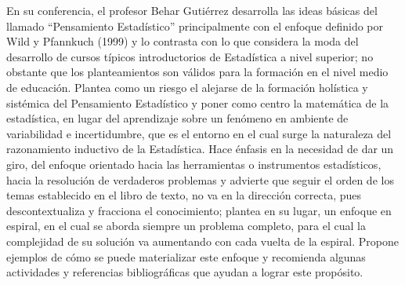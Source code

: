 \noindent En su conferencia, el profesor Behar Gutiérrez desarrolla las ideas básicas del llamado “Pensamiento Estadístico” principalmente con el enfoque definido por Wild y Pfannkuch (1999) y lo contrasta con lo que considera la moda del desarrollo de cursos típicos introductorios de Estadística a nivel superior; no obstante que los planteamientos son válidos para la formación en el nivel medio de educación. Plantea como un riesgo el alejarse de la formación holística y sistémica del Pensamiento Estadístico y poner como centro la matemática de la estadística, en lugar del aprendizaje sobre un fenómeno en ambiente de variabilidad e incertidumbre, que es el entorno en el cual surge la naturaleza del razonamiento inductivo de la Estadística. Hace énfasis en la necesidad de dar un giro, del enfoque orientado hacia las herramientas o instrumentos estadísticos, hacia la resolución de verdaderos problemas y advierte que seguir el orden de los temas establecido en el libro de texto, no va en la dirección correcta, pues descontextualiza y fracciona el conocimiento; plantea en su lugar, un enfoque en espiral, en el cual se aborda siempre un problema completo, para el cual la complejidad de su solución va aumentando con cada vuelta de la espiral. Propone ejemplos de cómo se puede materializar este enfoque y recomienda algunas actividades y referencias bibliográficas que ayudan a lograr este propósito. 

